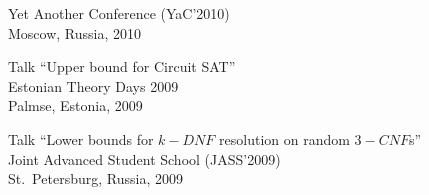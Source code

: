 \begin{innerlist}
       Yet Another Conference (YaC'2010)\\
       Moscow, Russia, 2010
 \item Talk ``Upper bound for Circuit SAT''\\
       Estonian Theory Days 2009\\
       Palmse, Estonia, 2009
 \item Talk ``Lower bounds for $k-DNF$ resolution on random $3-CNF$s''\\
       Joint Advanced Student School (JASS'2009)\\
       St.~Petersburg, Russia, 2009
\end{innerlist}

